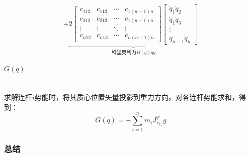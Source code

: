 \documentclass[
12pt, %
a4paper, 
oneside, %
headinclude,footinclude, %
]{scrartcl}
\begin{document}
\begin{itemize}
$$+ \underbrace{2\begin{bmatrix} c_{112} & c_{113} & \cdots & c_{1(n - 1)n} \\ c_{212} & c_{213} & \cdots & c_{1(n - 1)n} \\ \vdots & \vdots & \ddots & \vdots \\ c_{n12} & c_{n13} & \cdots & c_{n(n - 1)n} \end{bmatrix} \begin{bmatrix} \dot{q}_1 \dot{q}_2 \\ \dot{q}_1 \dot{q}_3 \\ \vdots \\ \dot{q}_{n - 1} \dot{q}_n \end{bmatrix}}_{\text{科里奥利力}B(q) \dot{q} \dot{q}}
$$
\end{itemize}
\paragraph{$ G(q) $}~\\

求解连杆$ i $势能时，将其质心位置矢量投影到重力方向。对各连杆势能求和，得到：
$$ G(q) = -\sum_{i = 1}^{n} m_i J_{v_{C_i}}^T g $$
\subsubsection[总结]{总结}
\end{document}
